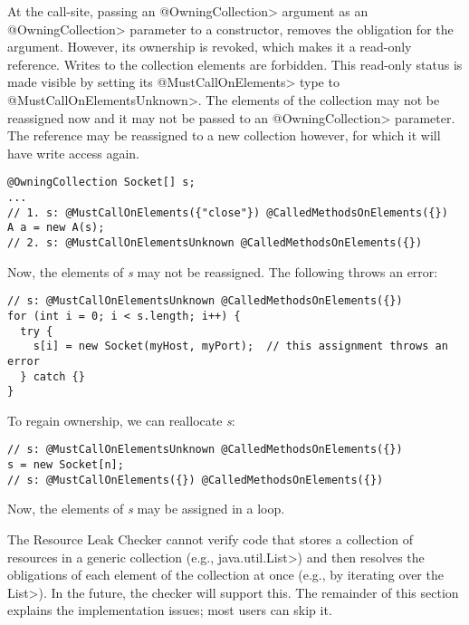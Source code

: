 At the call-site, passing an \<@OwningCollection> argument as an \<@OwningCollection> parameter to a constructor, removes the obligation for the argument. However, its ownership is revoked, which makes it a read-only reference. Writes to the collection elements are forbidden. This read-only status is made visible by setting its \<@MustCallOnElements> type to \<@MustCallOnElementsUnknown>. The elements of the collection may not be reassigned now and it may not be passed to an \<@OwningCollection> parameter. The reference may be reassigned to a new collection however, for which it will have write access again.

\begin{verbatim}
@OwningCollection Socket[] s;
...
// 1. s: @MustCallOnElements({"close"}) @CalledMethodsOnElements({})
A a = new A(s);
// 2. s: @MustCallOnElementsUnknown @CalledMethodsOnElements({})
\end{verbatim}

Now, the elements of \textit{s} may not be reassigned. The following throws an error:

\begin{verbatim}
// s: @MustCallOnElementsUnknown @CalledMethodsOnElements({})
for (int i = 0; i < s.length; i++) {
  try {
    s[i] = new Socket(myHost, myPort);  // this assignment throws an error
  } catch {}
}
\end{verbatim}

To regain ownership, we can reallocate \textit{s}:

\begin{verbatim}
// s: @MustCallOnElementsUnknown @CalledMethodsOnElements({})
s = new Socket[n];
// s: @MustCallOnElements({}) @CalledMethodsOnElements({})
\end{verbatim}

Now, the elements of \textit{s} may be assigned in a loop.



The Resource Leak Checker cannot verify code that stores a collection of
resources in a generic collection (e.g., \<java.util.List>) and then
resolves the obligations of each element of the collection at once (e.g.,
by iterating over the \<List>).  In the future, the checker will support
this.  The remainder of this section explains the implementation issues;
most users can skip it.

